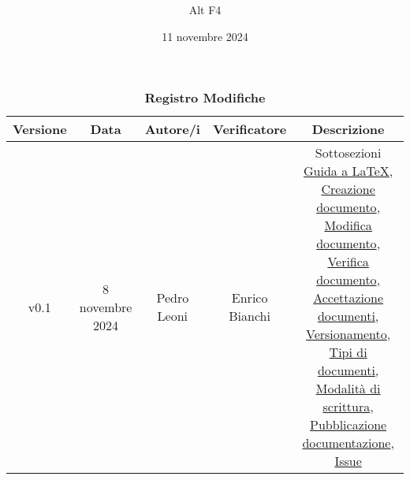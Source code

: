\documentclass[a4paper, 12pt]{article}
\title{\Huge \textbf{\titolo}}
\author{\Large{Alt} \raisebox{0.3ex}{\normalsize  +} \Large{F4}}
\date{ 11 novembre 2024}
\def\logo{../Immagini/logo.jpeg}
\begin{document}
\begin{titlepage}      
    \maketitle
    \thispagestyle{empty}  

\end{titlepage}

\thispagestyle{plain}
\begin{table}[!h]
    \centering
    \caption*{\textbf{\Large Registro Modifiche}}
    {\renewcommand{\arraystretch}{2}
    \begin{tabularx}{\textwidth}{| c | c | C | C | C |}
        \hline
            \textbf{\normalsize Versione} & 
            \textbf{\normalsize Data} & 
            \textbf{\normalsize Autore/i} & 
            \textbf{\normalsize Verificatore} &
            \textbf{\normalsize Descrizione} \\ 
        \hline \hline
        v0.1 & 
        8 novembre 2024  & 
        Pedro Leoni &
        Enrico Bianchi & 
        Sottosezioni \hyperref[subsec:gui]{Guida a \LaTeX}, 
        \hyperref[subsec:cre]{Creazione documento}, \hyperref[subsec:mod]{Modifica documento}, \hyperref[subsec:ver]{Verifica documento}, \hyperref[subsec:acc]{Accettazione documenti}, \hyperref[subsec:vers]{Versionamento}, \hyperref[subsec:docs]{Tipi di documenti}, \hyperref[subsec:mods]{Modalità di scrittura}, \hyperref[subsec:pub]{Pubblicazione documentazione}, \hyperref[subsec:issue]{Issue}\\
        \hline 
    \end{tabularx}}
\end{table}
\restoregeometry
\end{document}
